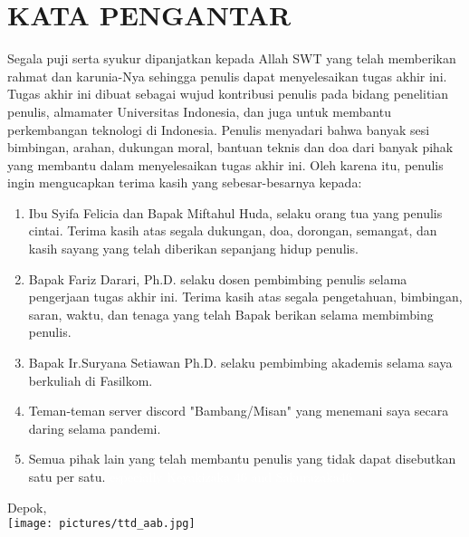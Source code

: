 \chapter*{KATA PENGANTAR}

Segala puji serta syukur dipanjatkan kepada Allah SWT yang telah memberikan rahmat dan karunia-Nya
sehingga penulis dapat menyelesaikan tugas akhir ini. Tugas akhir ini dibuat sebagai wujud
kontribusi penulis pada bidang penelitian penulis, almamater Universitas Indonesia, dan juga untuk
membantu perkembangan teknologi di Indonesia. Penulis menyadari bahwa banyak sesi bimbingan, arahan,
dukungan moral, bantuan teknis dan doa dari banyak pihak yang membantu dalam menyelesaikan tugas
akhir ini. Oleh karena itu, penulis ingin mengucapkan terima kasih yang sebesar-besarnya kepada:

\begin{enumerate}
	\item Ibu Syifa Felicia dan Bapak Miftahul Huda, selaku orang tua yang penulis cintai. Terima
	      kasih atas segala dukungan, doa, dorongan, semangat, dan kasih sayang yang telah diberikan
	      sepanjang hidup penulis.
	\item Bapak Fariz Darari, Ph.D. selaku dosen pembimbing penulis selama pengerjaan tugas akhir ini.
	      Terima kasih atas segala pengetahuan, bimbingan, saran, waktu, dan tenaga yang telah Bapak berikan
	      selama membimbing penulis.
	\item Bapak Ir.Suryana Setiawan Ph.D. selaku pembimbing akademis selama saya berkuliah di
	      Fasilkom.
	\item Teman-teman server discord "Bambang/Misan" yang menemani saya secara daring selama
	      pandemi.
	\item Semua pihak lain yang telah membantu penulis yang tidak dapat disebutkan satu per satu.
	      \textcolor{white}{especially Keyakizaka 46 and Sakurazaka46.}
\end{enumerate}

\vspace*{0.1cm}
\begin{flushright}
	Depok, \tanggalSiapSidang\\[0.1cm]
	\texttt{[image: pictures/ttd\_aab.jpg]}\\
	\penulis
\end{flushright}
